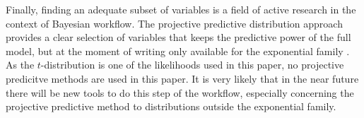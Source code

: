 Finally, finding an adequate subset of variables is a field of active research in the context of Bayesian workflow.
The projective predictive distribution approach provides a clear selection of variables that keeps the predictive power of the full model, but at the moment of writing only available for the exponential family \citep{piironen_sparsity_2017}.
As the $t$-distribution is one of the likelihoods used in this paper, no projective predicitve methods are used in this paper.
It is very likely that in the near future there will be new tools to do this step of the workflow, especially concerning the projective predictive method to distributions outside the exponential family.

